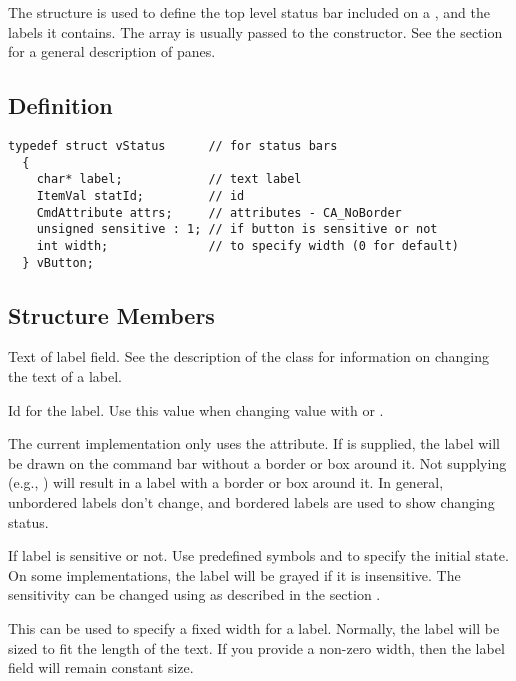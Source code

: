 The  structure is used to define the top level
status bar included on a , and the labels it
contains. The  array is usually passed to the
 constructor. See the section  for
a general description of panes.

\subsection* {Definition}

\footnotesize
\begin{verbatim}
typedef struct vStatus      // for status bars
  {
    char* label;            // text label
    ItemVal statId;         // id
    CmdAttribute attrs;     // attributes - CA_NoBorder
    unsigned sensitive : 1; // if button is sensitive or not
    int width;              // to specify width (0 for default)
  } vButton;
\end{verbatim}
\normalfont\normalsize

\subsection* {Structure Members}

 Text of label field. See the description of
the  class for information on changing the text of
a label.

 Id for the label. Use this value when changing
value with  or .

 The current implementation only uses
the  attribute. If  is
supplied, the label will be drawn on the command bar without a border
or box around it.  Not supplying  (e.g.,
) will result in a label with a border or box
around it. In general, unbordered labels don't change, and
bordered labels are used to show changing status.

 If label is sensitive or not. Use
predefined symbols  and  to specify
the initial state. On some implementations, the label will be
grayed if it is insensitive. The sensitivity can be changed
using  as described in the section
.

 This can be used to specify a fixed width for
a label. Normally, the label will be sized to fit the length of the
text. If you provide a non-zero width, then the label field will
remain constant size.


